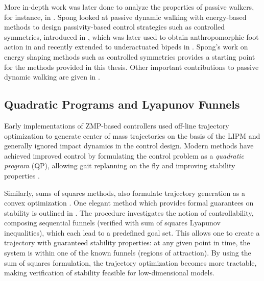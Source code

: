 More in-depth work was later done to analyze the properties of passive walkers,
for instance, in \cite{Espiau1994, Garcia1998, Borzova2004}.
%
Spong \cite{Spong1999} looked at passive dynamic walking with energy-based
methods to design passivity-based control strategies such as controlled
symmetries, introduced in \cite{Spong2005}, which was later used to obtain
anthropomorphic foot action in \cite{Sinnet2009, Sinnet2009a} and recently
extended to underactuated bipeds in \cite{Hu2011}.
%
Spong's work on energy shaping methods such as controlled symmetries provides a
starting point for the methods provided in this thesis.
Other important contributions to passive dynamic walking are given in
\cite{Anderson2005, Kuo1999, Kuo2002, Wisse2007}.


\subsection{Quadratic Programs and Lyapunov Funnels}

Early implementations of ZMP-based controllers used off-line trajectory
optimization to generate center of mass trajectories on the basis of the LIPM
and generally ignored impact dynamics in the control design.
%
Modern methods have achieved improved control by formulating the control problem
as a {\em quadratic  program} (QP), allowing gait replanning on the fly and
improving stability properties \cite{Kudoh2002, Stephens2010, Herdt2010}.
%

Similarly, sums of squares methods, also formulate trajectory generation as a
convex optimization \cite{Tedrake2010}.
%
One elegant method which provides formal guarantees on stability is outlined in
\cite{Majumdar2013}.
%
The procedure investigates the notion of controllability, composing sequential
funnels (verified with sum of squares Lyapunov inequalities), which each lead to
a predefined goal set.
%
This allows one to create a trajectory with guaranteed stability properties:
%
at any given point in time, the system is within one of the known funnels
(regions of attraction).
%
By using the sum of squares formulation, the trajectory optimization becomes
more tractable, making verification of stability feasible for low-dimensional
models.
